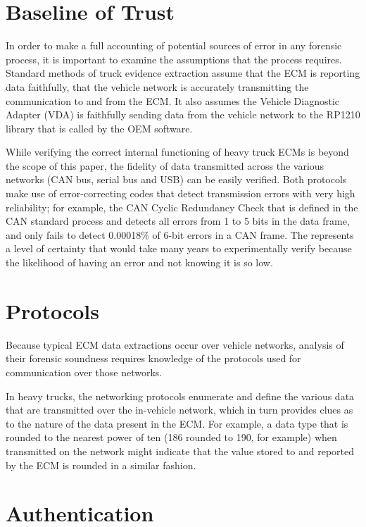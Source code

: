 \documentclass{report}
\begin{document}
\section{Baseline of Trust}

In order to make a full accounting of potential sources of error in any forensic process, it is important to examine the assumptions that the process requires. Standard methods of 
truck evidence extraction assume that the ECM is reporting data faithfully, that the vehicle network is accurately transmitting the communication to and from the ECM. It also assumes 
the Vehicle Diagnostic Adapter (VDA) is faithfully sending data from the vehicle network to the RP1210 library that is called by the OEM software.

While verifying the correct internal functioning of heavy truck ECMs is beyond the scope of this paper, the fidelity of data transmitted across the various networks (CAN bus, serial 
bus and USB) can be easily verified. Both protocols make use of error-correcting codes that detect transmission errors with very high reliability; for example, the CAN 
Cyclic Redundancy Check that is defined in the CAN standard process and detects all errors from 1 to 5 bits in the data frame, and only fails to detect 0.00018\% of 6-bit 
errors in a CAN frame\cite{koopman2004}. The represents a level of certainty that would take many years to experimentally verify because the likelihood of having an error and not knowing 
it is so low.

\section{Protocols}

Because typical ECM data extractions occur over vehicle networks, analysis of their forensic soundness requires knowledge of the protocols used for communication over those networks.

In heavy trucks, the networking protocols enumerate and define the various data that are transmitted over the in-vehicle network, which in turn provides clues as to the nature 
of the data present in the ECM. For example, a data type that is rounded to the nearest power of ten (186 rounded to 190, for example) when transmitted on the network might 
indicate that the value stored to and reported by the ECM is rounded in a similar fashion.

\section{Authentication}
\end{document}
